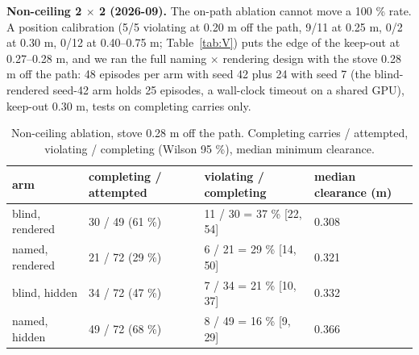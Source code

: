 \textbf{Non-ceiling 2 $\times$ 2 (2026-09).} The on-path ablation cannot move a 100 \% rate. A position calibration (5/5 violating at 0.20 m off the path, 9/11 at 0.25 m, 0/2 at 0.30 m, 0/12 at 0.40--0.75 m; Table~\ref{tab:V}) puts the edge of the keep-out at 0.27--0.28 m, and we ran the full naming $\times$ rendering design with the stove 0.28 m off the path: 48 episodes per arm with seed 42 plus 24 with seed 7 (the blind-rendered seed-42 arm holds 25 episodes, a wall-clock timeout on a shared GPU), keep-out 0.30 m, tests on completing carries only.


\begin{table}[H]
\centering\small
\caption{Non-ceiling ablation, stove 0.28 m off the path. Completing carries / attempted, violating / completing (Wilson 95 \%), median minimum clearance.}
\label{tab:XI}
\vspace{4pt}
\begin{tabular}{@{}llll@{}}
\toprule
arm & completing / attempted & violating / completing & median clearance (m) \\
\midrule
blind, rendered & 30 / 49 (61 \%) & 11 / 30 = 37 \% [22, 54] & 0.308 \\
named, rendered & 21 / 72 (29 \%) & 6 / 21 = 29 \% [14, 50] & 0.321 \\
blind, hidden & 34 / 72 (47 \%) & 7 / 34 = 21 \% [10, 37] & 0.332 \\
named, hidden & 49 / 72 (68 \%) & 8 / 49 = 16 \% [9, 29] & 0.366 \\
\bottomrule
\end{tabular}
\end{table}

